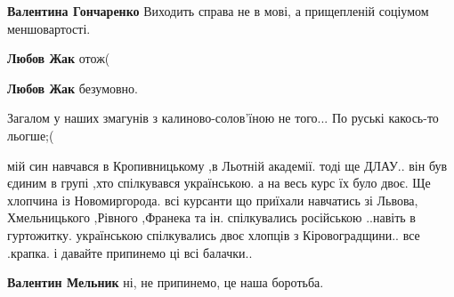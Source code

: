 \begin{itemize}
\begin{itemize}
\textbf{Валентина Гончаренко} Виходить справа не в мові, а прищепленій соціумом меншовартості.

 
\textbf{Любов Жак} отож(

 
\textbf{Любов Жак} безумовно.
\end{itemize}

 
Загалом у наших змагунів з калиново-солов'їною не того... По руські какось-то льогше;(

 

мій син навчався в Кропивницькому ,в Льотній академії. тоді ще ДЛАУ.. він був
єдиним в групі ,хто спілкувався українською. а на весь курс їх було двоє. Ще
хлопчина із Новомиргорода. всі курсанти що приїхали навчатись зі
Львова, Хмельницького ,Рівного ,Франека та ін. спілкувались російською ..навіть в
гуртожитку. українською спілкувались двоє хлопців з Кіровоградщини.. все
.крапка. і давайте припинемо ці всі балачки..

\begin{itemize}
 
\textbf{Валентин Мельник} ні, не припинемо, це наша боротьба.

 

\end{itemize}
\end{itemize}
